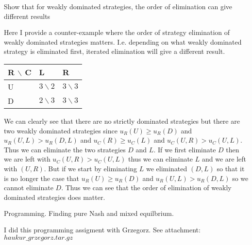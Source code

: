 \documentclass[12pt]{article}
\newenvironment{question}[2][Question]{\begin{trivlist}
\item[\hskip \labelsep {\bfseries #1}\hskip \labelsep {\bfseries #2.}]}{\end{trivlist}}
\newenvironment{answer}[2][Answer]{\begin{trivlist}
\item[\hskip \labelsep {\bfseries #1}\hskip \labelsep {\bfseries #2:}]}{\end{trivlist}}
\begin{document}
\begin{question}{2}
Show that for weakly dominated strategies, the order of elimination can give different results
\end{question}
\begin{answer}{a)}
Here I provide a counter-example where the order of strategy elimination of weakly dominated strategies matters. I.e. depending on what weakly dominated strategy is eliminated first, iterated elimination will give a different result.

\begin{table}[h]
    \begin{tabular}{|l|l|l|}
    \hline
    R $\backslash$ C & L            & R              \\ \hline
    U & $3\backslash 2$ & $3\backslash 3$   \\ \hline
    D & $2\backslash 3$ & $3\backslash 3$ \\ \hline
    \end{tabular}
\end{table}

We can clearly see that there are no strictly dominated strategies but there are two weakly dominated strategies since $u_R(U) \geq u_R(D)$ and $u_R(U,L) > u_R(D,L)$ and $u_C(R) \geq u_C(L)$ and $u_C(U,R) > u_C(U,L)$. Thus we can eliminate the two strategies $D$ and $L$. If we first eliminate $D$ then we are left with $u_C(U,R) > u_C(U,L)$ thus we can eliminate $L$ and we are left with $(U,R)$. But if we start by eliminating $L$ we eliminated $(D,L)$ so that it is no longer the case that $u_R(U) \geq u_R(D)$ and $u_R(U,L) > u_R(D,L)$ so we cannot eliminate $D$. Thus we can see that the order of elimination of weakly dominated strategies does matter.

\end{answer}

\begin{question}{4}
Programming. Finding pure Nash and mixed equilbrium.
\end{question}
\begin{answer}{a)}
I did this programming assigment with Grzegorz.
See attachment: $haukur\_grzegorz.tar.gz$
\end{answer}
\end{document}
